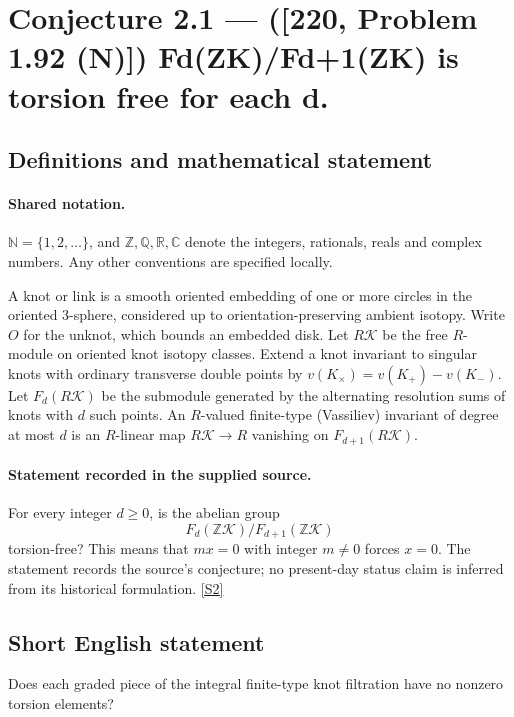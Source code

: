 \documentclass[11pt]{article}
\newcommand{\sref}[2]{\hyperlink{source:#1:#2}{[S#2]}}
\begin{document}
\section{Conjecture 2.1 — ([220, Problem 1.92 (N)]) Fd(ZK)/Fd+1(ZK) is torsion free for each d.}\label{statement}

\subsection{Definitions and mathematical statement}

\paragraph{Shared notation.}$\mathbb N=\{1,2,\ldots\}$, and $\mathbb Z,\mathbb Q,\mathbb R,\mathbb C$ denote the integers, rationals, reals and complex numbers. Any other conventions are specified locally.


A knot or link is a smooth oriented embedding of one or more circles in the oriented $3$-sphere, considered up to orientation-preserving ambient isotopy. Write $O$ for the unknot, which bounds an embedded disk. Let $R\mathcal K$ be the free $R$-module on oriented knot isotopy classes. Extend a knot invariant to singular knots with ordinary transverse double points by $v(K_\times)=v(K_+)-v(K_-)$. Let $F_d(R\mathcal K)$ be the submodule generated by the alternating resolution sums of knots with $d$ such points. An $R$-valued finite-type (Vassiliev) invariant of degree at most $d$ is an $R$-linear map $R\mathcal K\to R$ vanishing on $F_{d+1}(R\mathcal K)$.
\paragraph{Statement recorded in the supplied source.}
For every integer $d\ge0$, is the abelian group
\[F_d(\mathbb Z\mathcal K)/F_{d+1}(\mathbb Z\mathcal K)\]
torsion-free? This means that $m x=0$ with integer $m\ne0$ forces $x=0$. The statement records the source's conjecture; no present-day status claim is inferred from its historical formulation. \sref{statement}{2}
\subsection{Short English statement}
Does each graded piece of the integral finite-type knot filtration have no nonzero torsion elements?
\end{document}

